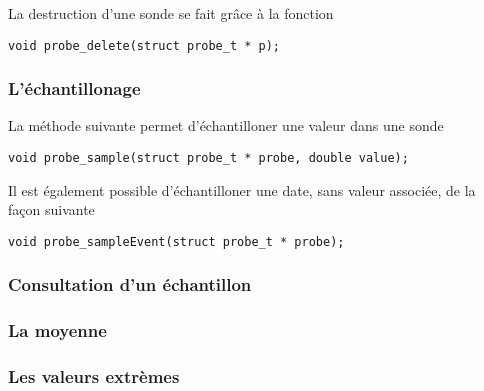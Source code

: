 \documentclass{article}
\begin{document}
   La destruction d'une sonde se fait grâce à la fonction 

\begin{verbatim}
void probe_delete(struct probe_t * p);
\end{verbatim}

%
\subsubsection{L'échantillonage}

   La méthode suivante permet d'échantilloner une valeur dans une
sonde 

\begin{verbatim}
void probe_sample(struct probe_t * probe, double value);
\end{verbatim}

   Il est également possible d'échantilloner une date, sans valeur
associée, de la façon suivante 

\begin{verbatim}
void probe_sampleEvent(struct probe_t * probe);
\end{verbatim}

%
\subsubsection{Consultation d'un échantillon}

%
\subsubsection{La moyenne}

%
\subsubsection{Les valeurs extrèmes}

%
\end{document}
